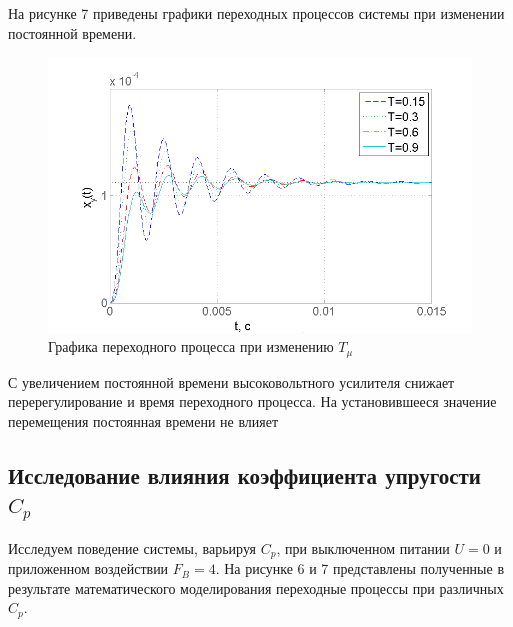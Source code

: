 \documentclass[a4paper, 12pt]{article}
\begin{document}
На рисунке 7 приведены графики переходных процессов системы при изменении постоянной времени.
\begin{figure}[h]
	\centering
	\includegraphics[width=0.7\linewidth]{8}
	\caption{Графика переходного процесса при изменению $T_{\mu}$}
	\label{}
\end{figure}

С увеличением постоянной времени высоковольтного усилителя снижает перерегулирование и время переходного процесса. На установившееся значение перемещения постоянная времени не влияет

\newpage
\begin{center}
	\section{Исследование влияния коэффициента упругости $C_p$}
\end{center} \par
Исследуем поведение системы, варьируя $C_p$, при выключенном питании $U = 0$ и приложенном воздействии $F_B = 4$. На рисунке 6 и 7 представлены полученные в результате математического моделирования переходные процессы при различных $C_p$.
\end{document}
